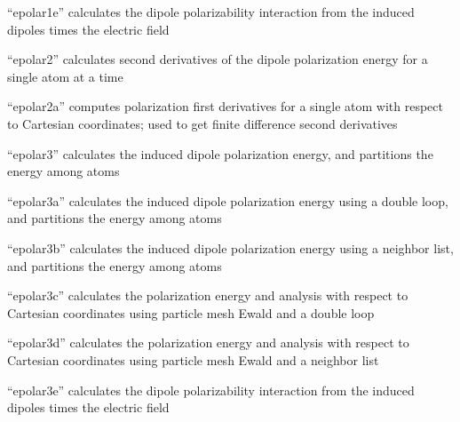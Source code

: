 \documentclass[letterpaper,11pt,english]{sphinxmanual}
\begin{document}
\sphinxAtStartPar
{}

\sphinxAtStartPar
“epolar1e” calculates the dipole polarizability interaction from the induced dipoles times the electric field

\sphinxAtStartPar
{}

\sphinxAtStartPar
“epolar2” calculates second derivatives of the dipole polarization energy for a single atom at a time

\sphinxAtStartPar
{}

\sphinxAtStartPar
“epolar2a” computes polarization first derivatives for a single atom with respect to Cartesian coordinates; used to get finite difference second derivatives

\sphinxAtStartPar
{}

\sphinxAtStartPar
“epolar3” calculates the induced dipole polarization energy, and partitions the energy among atoms

\sphinxAtStartPar
{}

\sphinxAtStartPar
“epolar3a” calculates the induced dipole polarization energy using a double loop, and partitions the energy among atoms

\sphinxAtStartPar
{}

\sphinxAtStartPar
“epolar3b” calculates the induced dipole polarization energy using a neighbor list, and partitions the energy among atoms

\sphinxAtStartPar
{}

\sphinxAtStartPar
“epolar3c” calculates the polarization energy and analysis with respect to Cartesian coordinates using particle mesh Ewald and a double loop

\sphinxAtStartPar
{}

\sphinxAtStartPar
“epolar3d” calculates the polarization energy and analysis with respect to Cartesian coordinates using particle mesh Ewald and a neighbor list

\sphinxAtStartPar
{}

\sphinxAtStartPar
“epolar3e” calculates the dipole polarizability interaction from the induced dipoles times the electric field

\sphinxAtStartPar
{}
\end{document}
